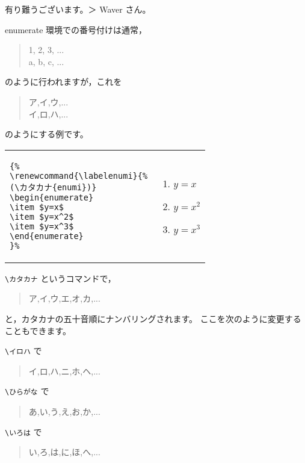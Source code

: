 \documentclass[fleqn,a4j]{jarticle}
\begin{document}
有り難うございます。＞ Waver さん。

enumerate 環境での番号付けは通常，
\begin{quote}
    1, 2, 3, ...\\
    a, b, c, ...
\end{quote}
のように行われますが，これを
\begin{quote}
    ア,イ,ウ,...\\
    イ,ロ,ハ,...
\end{quote}
のようにする例です。

\begin{shadebox}
\begin{tabular}{l@{\ $\longrightarrow$\ }l}
\begin{minipage}{16\zw}
\begin{verbatim}
{%
\renewcommand{\labelenumi}{%
(\カタカナ{enumi})}
\begin{enumerate}
\item $y=x$
\item $y=x^2$
\item $y=x^3$
\end{enumerate}
}%
\end{verbatim}
\end{minipage}
&
\begin{minipage}{6\zw}
\renewcommand{\labelenumi}{(\カタカナ{enumi})}
\begin{enumerate}
\item $y=x$
\item $y=x^2$
\item $y=x^3$
\end{enumerate}
\end{minipage}
\end{tabular}
\end{shadebox}

\verb/\カタカナ/ というコマンドで，
\begin{quote}
    ア,イ,ウ,エ,オ,カ,...
\end{quote}
と，カタカナの五十音順にナンバリングされます。
ここを次のように変更することもできます。

\verb/\イロハ/ で
\begin{quote}
    イ,ロ,ハ,ニ,ホ,ヘ,...
\end{quote}

\verb/\ひらがな/ で
\begin{quote}
    あ,い,う,え,お,か,...
\end{quote}

\verb/\いろは/ で
\begin{quote}
    い,ろ,は,に,ほ,へ,...
\end{quote}
\end{document}
